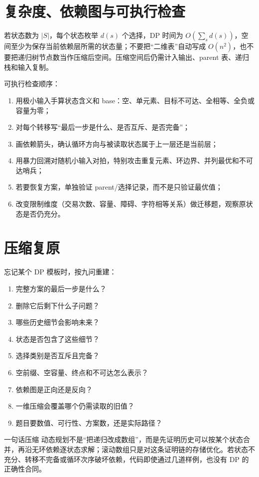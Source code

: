 \documentclass[UTF8,fontset=none,11pt,a4paper]{ctexart}
\begin{document}
\section{复杂度、依赖图与可执行检查}

若状态数为 $|S|$，每个状态枚举 $d(s)$ 个选择，DP 时间为 $O(\sum_s d(s))$，空间至少为保存当前依赖层所需的状态量；不要把“二维表”自动写成 $O(n^2)$，也不要把递归树节点数当作压缩后空间。压缩空间后仍需计入输出、parent 表、递归栈和输入复制。

可执行检查顺序：
\begin{enumerate}
\item 用极小输入手算状态含义和 base：空、单元素、目标不可达、全相等、全负或容量为零；
\item 对每个转移写“最后一步是什么、是否互斥、是否完备”；
\item 画依赖箭头，确认循环方向与被读取状态属于上一层还是当前层；
\item 用暴力回溯对随机小输入对拍，特别攻击重复元素、环边界、并列最优和不可达哨兵；
\item 若要恢复方案，单独验证 parent/选择记录，而不是只验证最优值；
\item 改变限制维度（交易次数、容量、障碍、字符相等关系）做迁移题，观察原状态是否仍充分。
\end{enumerate}

\section{压缩复原}

忘记某个 DP 模板时，按九问重建：
\begin{enumerate}
\item 完整方案的最后一步是什么？
\item 删除它后剩下什么子问题？
\item 哪些历史细节会影响未来？
\item 状态是否包含了这些细节？
\item 选择类别是否互斥且完备？
\item 空前缀、空容量、终点和不可达怎么表示？
\item 依赖图是正向还是反向？
\item 一维压缩会覆盖哪个仍需读取的旧值？
\item 题目要数值、可行性、方案数，还是实际路径？
\end{enumerate}

\begin{corebox}{一句话压缩}
动态规划不是“把递归改成数组”，而是先证明历史可以按某个状态合并，再沿无环依赖逐状态求解；滚动数组只是对这条证明链的存储优化。若状态不充分、转移不完备或循环次序破坏依赖，代码即使通过几道样例，也没有 DP 的正确性合同。
\end{corebox}
\end{document}
